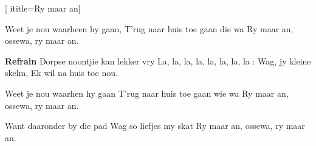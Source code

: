  [
ititle={Ry maar an}]

\beginverse
{}
{Weet je nou waarheen hy gaan,}
{T'rug naar huis toe gaan die wa}
{Ry maar an, ossewa, ry maar an.}
\endverse

\beginchorus
\textbf{Refrain}
Dorpse noontjie kan lekker vry
La, la, la, la, la, la, la, la :
Wag, jy kleine skelm,
Ek wil na huis toe nou.
\endchorus

\beginverse
{}
Weet je nou waarhen hy gaan
T'rug naar huis toe gaan wie wa
Ry maar an, ossewa, ry maar an.
\endverse

\beginverse
{}
Want daaronder by die pad
Wag so liefjes my skat
Ry maar an, ossewa, ry maar an.
\endverse
\endsong